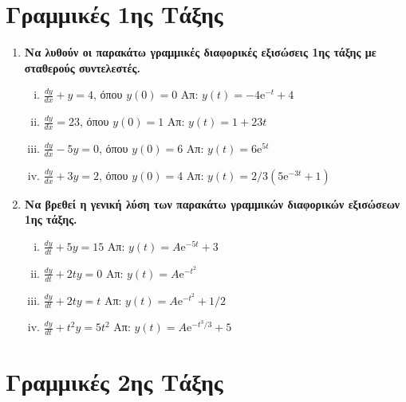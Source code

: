 


\pagestyle{askhseis}




\begin{center}
  \minibox{\large \bfseries \textcolor{Col1}{Ασκήσεις Διαφορικές Εξισώσεις}}
\end{center}

\vspace{\baselineskip}

\section*{Γραμμικές 1ης Τάξης}

\begin{enumerate}
  \item {\bfseries Να λυθούν οι παρακάτω γραμμικές διαφορικές εξισώσεις 1ης τάξης 
    με σταθερούς συντελεστές.}
    \begin{enumerate}[i)]
      \item  $\frac{dy}{dx} + y = 4$, όπου $y(0) = 0$ 
        \hfill Απ: $ y(t)=-4 \mathrm{e}^{-t} + 4$
      \item  $\frac{dy}{dx} = 23$, όπου $y(0) = 1$ 
        \hfill Απ: $ y(t)=1+23t $ 
      \item  $\frac{dy}{dx} -5 y = 0$, όπου $y(0) = 6$ 
        \hfill Απ: $ y(t)=6 \mathrm{e}^{5t} $ 
      \item  $\frac{dy}{dx} +3 y = 2$, όπου $y(0) = 4$ 
        \hfill Απ: $ y(t)=2/3(5\mathrm{e}^{-3t} +1) $ 
    \end{enumerate}

  \item {\bfseries Να βρεθεί η γενική λύση των παρακάτω γραμμικών διαφορικών εξισώσεων 
    1ης τάξης.}
    \begin{enumerate}[i)]
      \item  $\frac{dy}{dt} + 5y = 15$ \hfill Απ: $ y(t)=A \mathrm{e}^{-5t} +3 $ 
      \item  $\frac{dy}{dt} + 2ty = 0$ \hfill Απ: $ y(t)=A \mathrm{e}^{-t^{2}} $ 
      \item  $\frac{dy}{dt} + 2ty = t$ \hfill Απ: $ y(t)=A \mathrm{e}^{-t^{2}} +1/2 $ 
      \item  $\frac{dy}{dt} + t^{2}y = 5t^{2}$ 
        \hfill Απ: $ y(t)=A \mathrm{e}^{-t^{3}/3} +5 $ 
    \end{enumerate}
\end{enumerate}

\section*{Γραμμικές 2ης Τάξης}


